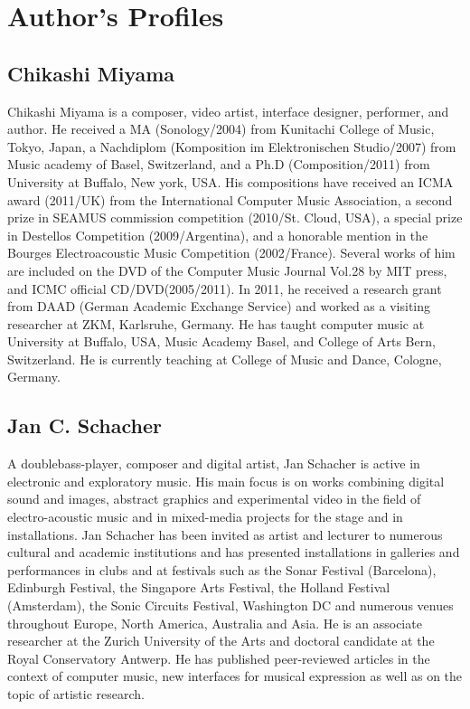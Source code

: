 \documentclass[a4paper]{article}
\begin{document}
\printbibliography


\section{Author's Profiles}
\balance %

\subsection*{Chikashi Miyama}
Chikashi Miyama is a composer, video artist, interface designer, performer, and author. He received a MA (Sonology/2004) from Kunitachi College of Music, Tokyo, Japan, a Nachdiplom (Komposition im Elektronischen Studio/2007) from Music academy of Basel, Switzerland, and a Ph.D (Composition/2011) from University at Buffalo, New york, USA. His compositions have received an ICMA award (2011/UK) from the International Computer Music Association, a second prize in SEAMUS commission competition (2010/St. Cloud, USA), a special prize in Destellos Competition (2009/Argentina), and a honorable mention in the Bourges Electroacoustic Music Competition (2002/France). Several works of him are included on the DVD of the Computer Music Journal Vol.28 by MIT press, and ICMC official CD/DVD(2005/2011). In 2011, he received a research grant from DAAD (German Academic Exchange Service) and worked as a visiting researcher at ZKM, Karlsruhe, Germany. He has taught computer music at  University at Buffalo, USA,  Music Academy Basel, and College of Arts Bern, Switzerland. He is currently teaching at College of Music and Dance, Cologne, Germany. 

\subsection*{Jan C. Schacher}
A doublebass-player, composer and digital artist, Jan Schacher is active in electronic and exploratory music. His main focus is on works combining digital sound and images, abstract graphics and experimental video in the field of electro-acoustic music and in mixed-media projects for the stage and in installations. Jan Schacher has been invited as artist and lecturer to numerous cultural and academic institutions and has presented installations in galleries and performances in clubs and at festivals such as the Sonar Festival (Barcelona), Edinburgh Festival, the Singapore Arts Festival, the Holland Festival (Amsterdam), the Sonic Circuits Festival, Washington DC and numerous venues throughout Europe, North America, Australia and Asia. He is an associate researcher at the Zurich University of the Arts and doctoral candidate at the Royal Conservatory Antwerp.
He has published peer-reviewed articles in the context of computer music, new interfaces for musical expression as well as on the topic of artistic research.
\end{document}
